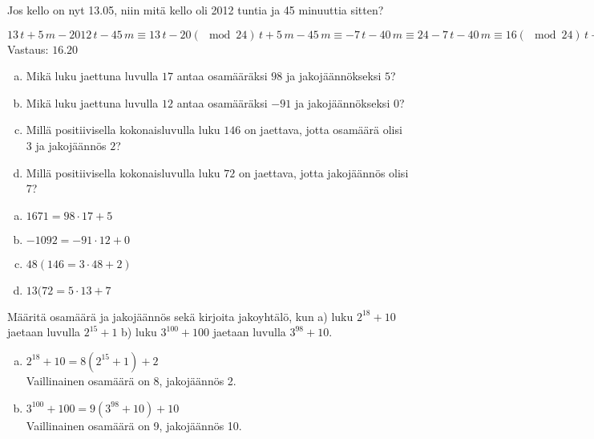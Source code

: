 \begin{tehtavasivu}
\begin{tehtava}
\end{tehtava}

\begin{tehtava}
    Jos kello on nyt 13.05, niin mitä kello oli 2012 tuntia ja 45 minuuttia sitten?
    \begin{vastaus}
        $13\, t + 5\, m - 2012\, t - 45\, m \equiv 13\, t - 20(\mod 24)\, t + 5\, m - 45\, m \equiv -7\, t -40\, m \equiv 24 -7\, t -40\, m \equiv 16(\mod 24)\, t + 20\, m $ \\
        Vastaus: $16.20$
    \end{vastaus}
\end{tehtava}

\begin{tehtava}
	\begin{enumerate}[a)]
	\item Mikä luku jaettuna luvulla $17$ antaa osamääräksi $98$ ja jakojäännökseksi $5$?
	\item Mikä luku jaettuna luvulla $12$ antaa osamääräksi $-91$ ja jakojäännökseksi $0$?
	\item Millä positiivisella kokonaisluvulla luku $146$ on jaettava, jotta osamäärä olisi $3$ ja jakojäännös $2$?
	\item Millä positiivisella kokonaisluvulla luku $72$ on jaettava, jotta jakojäännös olisi 7?
	\end{enumerate}
    \begin{vastaus}
        \begin{enumerate}[a)]
        \item $1671 = 98\cdot 17 + 5$
        \item $-1092 = -91\cdot 12 + 0$
        \item $48 (146 = 3\cdot 48 + 2)$
        \item $13 (72 = 5\cdot 13 + 7$
        \end{enumerate}     
    \end{vastaus}
\end{tehtava}

\begin{tehtava}
	Määritä osamäärä ja jakojäännös sekä kirjoita jakoyhtälö, kun a) luku $2^{18} + 10$ jaetaan luvulla $2^{15} + 1$ b) luku $3^{100} + 100$ jaetaan luvulla $3^{98} + 10$.
    \begin{vastaus}
        \begin{enumerate}[a)]
        \item $2^{18} + 10 = 8(2^{15} +1) + 2$ \\
        Vaillinainen osamäärä on 8, jakojäännös 2.
        \item $3^{100} + 100 = 9(3^{98} + 10) + 10$ \\
        Vaillinainen osamäärä on 9, jakojäännös 10.
        \end{enumerate}     
    \end{vastaus}
\end{tehtava}


\end{tehtavasivu}
